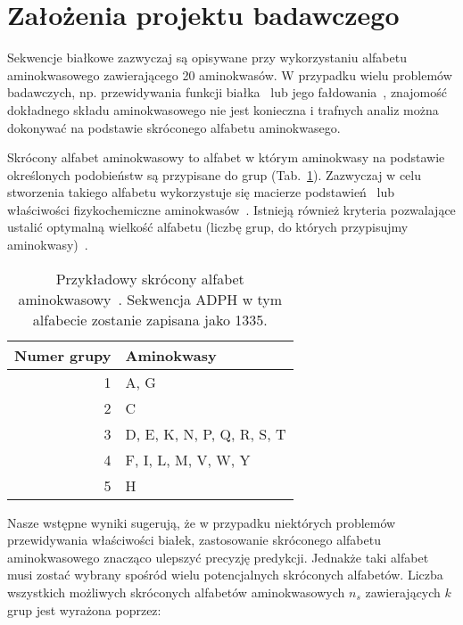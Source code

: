 \documentclass{article}
\author{Michał Burdukiewicz, Przemysław Gagat}
\title{Tworzenie skróconych alfabetów aminokwasowych dla białek 
amyloidogennych\linebreak \vskip{} 
\large{Projekt badawczy Doktoranckiego Koła Naukowego Bioinformatyki}}
\date{}
\begin{document}
\maketitle

\section{Założenia projektu badawczego}

Sekwencje białkowe zazwyczaj są opisywane przy wykorzystaniu alfabetu 
aminokwasowego zawierającego 20 aminokwasów. W przypadku wielu problemów 
badawczych, np. przewidywania funkcji białka~\citep{longo_simplified_2013} lub 
jego fałdowania~\citep{murphy_simplified_2000}, znajomość dokładnego składu 
aminokwasowego nie jest konieczna i trafnych analiz można dokonywać na podstawie 
skróconego alfabetu aminokwasego.

Skrócony alfabet aminokwasowy to alfabet w którym aminokwasy na podstawie 
określonych podobieństw są przypisane do grup (Tab.~\ref{tab:przykladowy}). 
Zazwyczaj w celu stworzenia takiego alfabetu wykorzystuje się macierze 
podstawień~\citep{cannata_simplifying_2002} lub właściwości fizykochemiczne 
aminokwasów~\citep{stephenson_unearthing_2013}. Istnieją również
kryteria pozwalające ustalić optymalną wielkość alfabetu (liczbę grup, do 
których przypisujmy aminokwasy)~\citep{solis_amino_2015}.

\begin{table}[ht]
\centering
\caption{Przykładowy skrócony alfabet 
aminokwasowy~\citep{melo_accuracy_2006}. Sekwencja ADPH w tym alfabecie 
zostanie zapisana jako 1335.} 
\begin{tabular}{rl}
  \toprule
Numer grupy & Aminokwasy \\ 
  \midrule
  1 & A, G \\ 
   \rowcolor[gray]{0.85}  2 & C \\ 
    3 & D, E, K, N, P, Q, R, S, T \\ 
   \rowcolor[gray]{0.85}  4 & F, I, L, M, V, W, Y \\ 
    5 & H \\ 
   \bottomrule
\end{tabular}
\label{tab:przykladowy}
\end{table}

Nasze wstępne wyniki sugerują, że w przypadku niektórych problemów 
przewidywania właściwości białek, zastosowanie skróconego alfabetu 
aminokwasowego znacząco ulepszyć precyzję predykcji. Jednakże taki alfabet musi 
zostać wybrany spośród wielu potencjalnych skróconych alfabetów. 
Liczba wszystkich możliwych skróconych alfabetów aminokwasowych $n_s$ 
zawierających $k$ grup jest wyrażona poprzez: 
\end{document}
